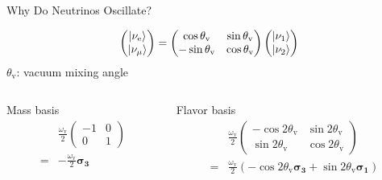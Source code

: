 \documentclass[9pt]{beamer}
\begin{document}
\begin{darkframes}
\begin{frame}[fragile]{Why Do Neutrinos Oscillate?}
\begin{tcolorbox}[title=Flavor basis]
\begin{equation*}
\begin{pmatrix}\left| \nu_{\mathrm e}\right\rangle \\ \left| \nu_{\mathrm \mu} \right\rangle \end{pmatrix} = \begin{pmatrix}  \cos\theta_{\mathrm{v}}  & \sin\theta_{\mathrm{v}} \\ -\sin\theta_{\mathrm{v}}  & \cos\theta_{\mathrm{v}} \end{pmatrix}   \begin{pmatrix}\left| \nu_1\right\rangle \\ \left| \nu_2\right\rangle\end{pmatrix}
\end{equation*}
$\theta_{\mathrm{v}}$: vacuum mixing angle


\end{tcolorbox}

\pause

\begin{tcolorbox}[title=Hamiltonian $\mathbf H$]

\begin{columns}[T] %
\begin{column}{.39\textwidth}

\centering Mass basis
\begin{align*}
&\frac{\omega_{\mathrm{v}}}{2}\begin{pmatrix}
-1  & 0 \\
0 & 1
\end{pmatrix}\\
=&
-\frac{\omega_{\mathrm v} }{2}\boldsymbol{ \sigma_3 }
\end{align*}



\end{column}%
\hfill%

\begin{column}{.59\textwidth}
\centering Flavor basis
\begin{align*}
&\frac{\omega_{\mathrm v} }{2}\begin{pmatrix} -\cos 2\theta_{\mathrm{v}} & \sin 2 \theta_{\mathrm{v}} \\ \sin 2\theta_{\mathrm{v}} & \cos 2\theta_{\mathrm{v}}  \end{pmatrix} \\
=&
\frac{\omega_{\mathrm v} }{2}\left( - \cos 2\theta_{\mathrm{v}}\boldsymbol{ \sigma_3 } + \sin 2\theta_{\mathrm{v}} \boldsymbol{\sigma_1} \right)
\end{align*}


\end{column}
\end{columns}
\end{tcolorbox}
\end{frame}
\end{darkframes}
\end{document}
